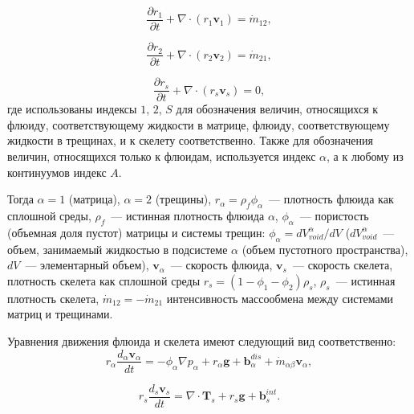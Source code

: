 \begin{equation}
  \label{eq:masbalance1}
  \frac{\partial r_1}{\partial t} + \nabla \cdot (r_1 {\textbf{v}}_1 ) = \dot{m}_{12},
\end{equation}

\begin{equation}
  \label{eq:masbalance2}
  \frac{\partial r_2}{\partial t} + \nabla \cdot (r_2 {{\textbf{v}}}_2) = \dot{m}_{21},
\end{equation}

\begin{equation}
  \label{eq:masbalance3}
  \frac{\partial r_s}{\partial t} + \nabla \cdot (r_s {{\textbf{v}}}_s) = 0,
\end{equation}
где использованы индексы $1$, $2$, $S$ для обозначения величин, относящихся к флюиду, соответствующему жидкости в матрице, флюиду, соответствующему жидкости в трещинах, и к скелету соответственно. Также для обозначения величин, относящихся только к флюидам, используется индекс $\alpha$, а к любому из континуумов индекс $A$.

Тогда $\alpha = 1$ (матрица), $\alpha = 2$ (трещины), $r_{\alpha} = \rho_{f} \phi_{\alpha}$~--- плотность флюида как сплошной среды, $\rho_f$~--- истинная плотность флюида $\alpha$, $\phi_{\alpha}$~--- пористость (объемная доля пустот) матрицы и системы трещин: $\phi_{\alpha} = d V_{void}^{\alpha}/dV$ ($d V_{void}^{\alpha}$~--- объем, занимаемый жидкостью в подсистеме $\alpha$ (объем пустотного пространства), $d V$~--- элементарный объем), ${\textbf{v}}_{\alpha}$~--- скорость флюида, $\textbf{v}_{s}$~--- скорость скелета, плотность скелета как сплошной среды $r_s = (1 - \phi_1 - \phi_2) \rho_s$, $\rho_s$~--- истинная плотность скелета, $\dot{m}_{12} = -\dot{m}_{21}$ интенсивность массообмена между системами матриц и трещинами.

Уравнения движения флюида и скелета имеют следующий вид соответственно:
\begin{equation}
  \label{eq:motion1}
  r_{\alpha} \frac{d_{\alpha} \textbf{v}_{\alpha}}{d t} = - \phi_{\alpha} \nabla p_{\alpha} + r_{\alpha} {\textbf{g}} + \textbf{b}_{\alpha}^{dis} + \dot{m}_{\alpha \beta} \textbf{v}_{\alpha},
\end{equation}

\begin{equation}
  \label{eq:motion2}
  r_s \frac{d_s {\textbf{v}}_s}{d t} = \nabla \cdot {\textbf{T}}_s + r_s {\textbf{g}} + {\textbf{b}}_s^{int}.
\end{equation}

